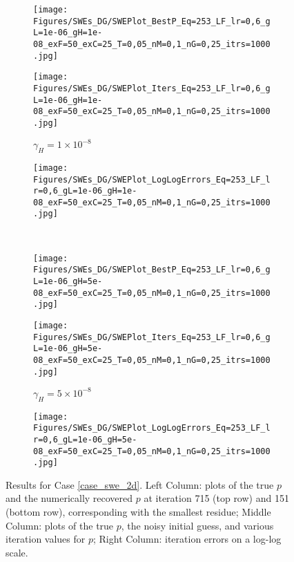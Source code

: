 \begin{figure}[h]
    \begin{subfigure}[t]{0.32\textwidth}
        \centering
        \texttt{[image: Figures/SWEs\_DG/SWEPlot\_BestP\_Eq=253\_LF\_lr=0,6\_gL=1e-06\_gH=1e-08\_exF=50\_exC=25\_T=0,05\_nM=0,1\_nG=0,25\_itrs=1000.jpg]}
    \end{subfigure}
    \begin{subfigure}[t]{0.32\textwidth}
        \centering
        \texttt{[image: Figures/SWEs\_DG/SWEPlot\_Iters\_Eq=253\_LF\_lr=0,6\_gL=1e-06\_gH=1e-08\_exF=50\_exC=25\_T=0,05\_nM=0,1\_nG=0,25\_itrs=1000.jpg]}
        \caption{$\gamma_H=1\times 10^{-8}$}
    \end{subfigure}
    \begin{subfigure}[t]{0.32\textwidth}
        \texttt{[image: Figures/SWEs\_DG/SWEPlot\_LogLogErrors\_Eq=253\_LF\_lr=0,6\_gL=1e-06\_gH=1e-08\_exF=50\_exC=25\_T=0,05\_nM=0,1\_nG=0,25\_itrs=1000.jpg]}
    \end{subfigure} \\
    \begin{subfigure}[t]{0.32\textwidth}
        \centering
        \texttt{[image: Figures/SWEs\_DG/SWEPlot\_BestP\_Eq=253\_LF\_lr=0,6\_gL=1e-06\_gH=5e-08\_exF=50\_exC=25\_T=0,05\_nM=0,1\_nG=0,25\_itrs=1000.jpg]}
    \end{subfigure}
    \begin{subfigure}[t]{0.32\textwidth}
        \centering
        \texttt{[image: Figures/SWEs\_DG/SWEPlot\_Iters\_Eq=253\_LF\_lr=0,6\_gL=1e-06\_gH=5e-08\_exF=50\_exC=25\_T=0,05\_nM=0,1\_nG=0,25\_itrs=1000.jpg]}
        \caption{$\gamma_H=5\times 10^{-8}$}
        \label{fig:swe_2Db}
    \end{subfigure}
    \begin{subfigure}[t]{0.32\textwidth}
        \texttt{[image: Figures/SWEs\_DG/SWEPlot\_LogLogErrors\_Eq=253\_LF\_lr=0,6\_gL=1e-06\_gH=5e-08\_exF=50\_exC=25\_T=0,05\_nM=0,1\_nG=0,25\_itrs=1000.jpg]}
    \end{subfigure}
    \caption{Results for Case \eqref{case_swe_2d}. 
    Left Column: plots of the true $p$ and the numerically recovered $p$ at iteration 715 (top row) and 151 (bottom row), corresponding with the smallest residue; Middle Column: plots of the true $p$, the noisy initial guess, and various iteration values for $p$; Right Column: iteration errors on a log-log scale.}
    \label{fig:swe_2D}
\end{figure}


